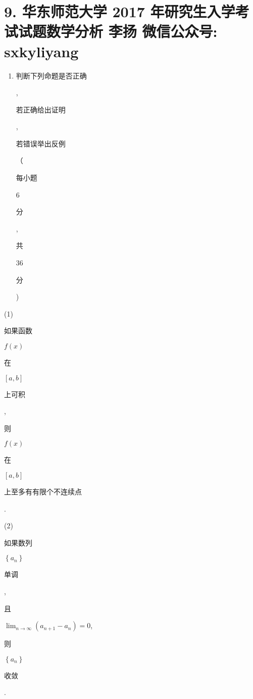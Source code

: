 \documentclass[10pt]{article}
\begin{document}
\section{9. 华东师范大学 2017 年研究生入学考试试题数学分析 
 李扬 
 微信公众号: sxkyliyang}
\begin{enumerate}
  \item \begin{CJK}{UTF8}{mj}判断下列命题是否正确\end{CJK}, \begin{CJK}{UTF8}{mj}若正确给出证明\end{CJK}, \begin{CJK}{UTF8}{mj}若错误举出反例\end{CJK}（\begin{CJK}{UTF8}{mj}每小题\end{CJK} 6 \begin{CJK}{UTF8}{mj}分\end{CJK}, \begin{CJK}{UTF8}{mj}共\end{CJK} 36 \begin{CJK}{UTF8}{mj}分\end{CJK})
\end{enumerate}
(1) \begin{CJK}{UTF8}{mj}如果函数\end{CJK} $f(x)$ \begin{CJK}{UTF8}{mj}在\end{CJK} $[a, b]$ \begin{CJK}{UTF8}{mj}上可积\end{CJK}, \begin{CJK}{UTF8}{mj}则\end{CJK} $f(x)$ \begin{CJK}{UTF8}{mj}在\end{CJK} $[a, b]$ \begin{CJK}{UTF8}{mj}上至多有有限个不连续点\end{CJK}.

(2) \begin{CJK}{UTF8}{mj}如果数列\end{CJK} $\left\{a_{n}\right\}$ \begin{CJK}{UTF8}{mj}单调\end{CJK}, \begin{CJK}{UTF8}{mj}且\end{CJK} $\lim _{n \rightarrow \infty}\left(a_{n+1}-a_{n}\right)=0$, \begin{CJK}{UTF8}{mj}则\end{CJK} $\left\{a_{n}\right\}$ \begin{CJK}{UTF8}{mj}收敛\end{CJK}.
\end{document}
